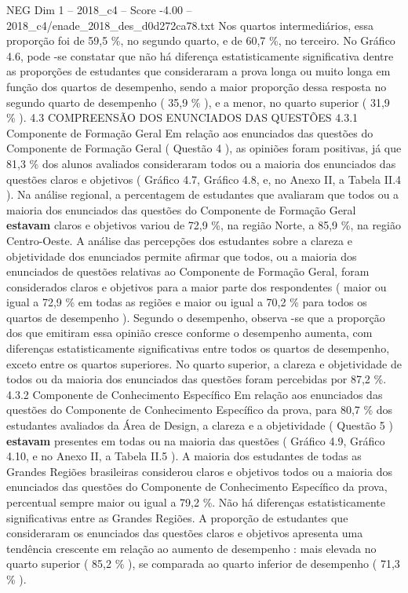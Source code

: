 \begin{textsample}{NEG Dim 1 – 2018\_c4 – Score -4.00 – 2018\_c4/enade\_2018\_des\_d0d272ca78.txt}
Nos quartos intermediários, essa proporção foi de 59,5 \%, no segundo quarto, e de 60,7 \%, no terceiro.
No Gráfico 4.6, pode -se constatar que não há diferença estatisticamente significativa dentre as proporções de estudantes que consideraram a prova longa ou muito longa em função dos quartos de desempenho, sendo a maior proporção dessa resposta no segundo quarto de desempenho ( 35,9 \% ), e a menor, no quarto superior ( 31,9 \% ). 4.3 COMPREENSÃO DOS ENUNCIADOS DAS QUESTÕES 4.3.1 Componente de Formação Geral Em relação aos enunciados das questões do Componente de Formação Geral ( Questão 4 ), as opiniões foram positivas, já que 81,3 \% dos alunos avaliados consideraram todos ou a maioria dos enunciados das questões claros e objetivos ( Gráfico 4.7, Gráfico 4.8, e, no Anexo II, a Tabela II.4 ).
Na análise regional, a percentagem de estudantes que avaliaram que todos ou a maioria dos enunciados das questões do Componente de Formação Geral \textbf{estavam} claros e objetivos variou de 72,9 \%, na região Norte, a 85,9 \%, na região Centro-Oeste.
A análise das percepções dos estudantes sobre a clareza e objetividade dos enunciados permite afirmar que todos, ou a maioria dos enunciados de questões relativas ao Componente de Formação Geral, foram considerados claros e objetivos para a maior parte dos respondentes ( maior ou igual a 72,9 \% em todas as regiões e maior ou igual a 70,2 \% para todos os quartos de desempenho ).
Segundo o desempenho, observa -se que a proporção dos que emitiram essa opinião cresce conforme o desempenho aumenta, com diferenças estatisticamente significativas entre todos os quartos de desempenho, exceto entre os quartos superiores.
No quarto superior, a clareza e objetividade de todos ou da maioria dos enunciados das questões foram percebidas por 87,2 \%. 4.3.2 Componente de Conhecimento Específico Em relação aos enunciados das questões do Componente de Conhecimento Específico da prova, para 80,7 \% dos estudantes avaliados da Área de Design, a clareza e a objetividade ( Questão 5 ) \textbf{estavam} presentes em todas ou na maioria das questões ( Gráfico 4.9, Gráfico 4.10, e no Anexo II, a Tabela II.5 ).
A maioria dos estudantes de todas as Grandes Regiões brasileiras considerou claros e objetivos todos ou a maioria dos enunciados das questões do Componente de Conhecimento Específico da prova, percentual sempre maior ou igual a 79,2 \%.
Não há diferenças estatisticamente significativas entre as Grandes Regiões.
A proporção de estudantes que consideraram os enunciados das questões claros e objetivos apresenta uma tendência crescente em relação ao aumento de desempenho : mais elevada no quarto superior ( 85,2 \% ), se comparada ao quarto inferior de desempenho ( 71,3 \% ).

\end{textsample}
